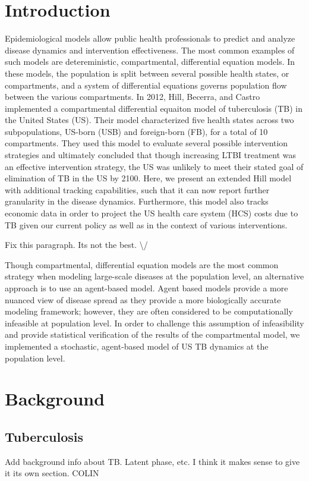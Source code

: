 \documentclass{amsart}
\begin{document}
\section{Introduction}
Epidemiological models allow public health professionals to predict and analyze
disease dynamics and intervention effectiveness. The most common examples of
such models are detereministic, compartmental, differential equation models. In
these models, the population is split between several possible health states, or
compartments, and a system of differential equations governs population flow
between the various compartments. In 2012, Hill, Becerra, and Castro implemented
a compartmental differential equaiton model of tuberculosis (TB) in the United
States (US).  Their model characterized five health states across two
subpopulations, US-born (USB) and foreign-born (FB), for a total of 10
compartments. They used this model to evaluate several possible intervention
strategies and ultimately concluded that though increasing LTBI treatment was an
effective intervention strategy, the US was unlikely to meet their stated goal
of elimination of TB in the US by 2100. Here, we present an extended Hill model
with additional tracking capabilities, such that it can now report
further granularity in the disease dynamics. Furthermore, this model also tracks
economic data in order to project the US health care system (HCS) costs due to
TB given our current policy as well as in the context of various interventions. 

{\huge \color{red} Fix this paragraph. Its not the best. \textbackslash/}

Though compartmental, differential equation models are the most common strategy
when modeling large-scale diseases at the population level, an alternative
approach is to use an agent-based model. Agent
based models provide a more nuanced view of disease spread as they provide a
more biologically accurate modeling framework; however, they are often
considered to be computationally infeasible at population level. In order to
challenge this assumption of infeasibility and provide statistical verification
of the results of the compartmental model, we implemented a stochastic,
agent-based model of US TB dynamics at the population level.

\section{Background}
\subsection{Tuberculosis}
{\huge \color{red} Add background info about TB. Latent phase, etc. I think it
makes sense to give it its own section. COLIN}
\end{document}
